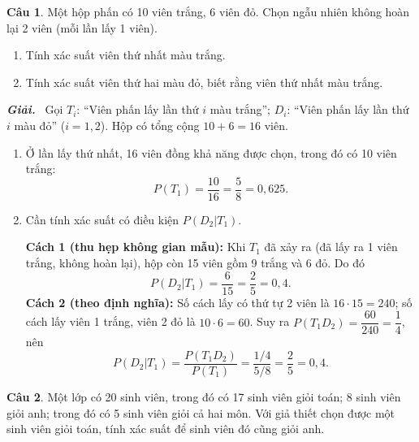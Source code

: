 \documentclass[12pt,a4paper]{article}
\theoremstyle{definition}
\newtheorem{cau}{Câu}
\newcommand{\giai}{\noindent\textbf{\textit{Giải.}}\ }
\newcommand{\dapso}[1]{\noindent\fbox{\textbf{Đáp số:} #1}}
\begin{document}
\vspace{1em}
\begin{cau}
Một hộp phấn có 10 viên trắng, 6 viên đỏ. Chọn ngẫu nhiên không hoàn lại 2 viên (mỗi lần lấy 1 viên).
\begin{enumerate}[label=\arabic*.]
    \item Tính xác suất viên thứ nhất màu trắng.
    \item Tính xác suất viên thứ hai màu đỏ, biết rằng viên thứ nhất màu trắng.
\end{enumerate}
\end{cau}

\giai
Gọi $T_i$: ``Viên phấn lấy lần thứ $i$ màu trắng''; $D_i$: ``Viên phấn lấy lần thứ $i$ màu đỏ'' ($i = 1, 2$). Hộp có tổng cộng $10 + 6 = 16$ viên.
\begin{enumerate}[label=\arabic*.]
    \item Ở lần lấy thứ nhất, 16 viên đồng khả năng được chọn, trong đó có 10 viên trắng:
    \[
    P(T_1) = \frac{10}{16} = \frac{5}{8} = 0{,}625.
    \]
    \item Cần tính xác suất có điều kiện $P(D_2|T_1)$.

    \textbf{Cách 1 (thu hẹp không gian mẫu):} Khi $T_1$ đã xảy ra (đã lấy ra 1 viên trắng, không hoàn lại), hộp còn 15 viên gồm 9 trắng và 6 đỏ. Do đó
    \[
    P(D_2|T_1) = \frac{6}{15} = \frac{2}{5} = 0{,}4.
    \]
    \textbf{Cách 2 (theo định nghĩa):} Số cách lấy có thứ tự 2 viên là $16 \cdot 15 = 240$; số cách lấy viên 1 trắng, viên 2 đỏ là $10 \cdot 6 = 60$. Suy ra $P(T_1 D_2) = \dfrac{60}{240} = \dfrac{1}{4}$, nên
    \[
    P(D_2|T_1) = \frac{P(T_1 D_2)}{P(T_1)} = \frac{1/4}{5/8} = \frac{2}{5} = 0{,}4.
    \]
\end{enumerate}
\dapso{1. $\dfrac{5}{8} = 0{,}625$;\quad 2. $\dfrac{2}{5} = 0{,}4$.}

\vspace{1em}
\begin{cau}
Một lớp có 20 sinh viên, trong đó có 17 sinh viên giỏi toán; 8 sinh viên giỏi anh; trong đó có 5 sinh viên giỏi cả hai môn. Với giả thiết chọn được một sinh viên giỏi toán, tính xác suất để sinh viên đó cũng giỏi anh.
\end{cau}
\end{document}
